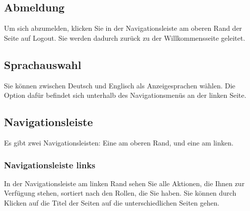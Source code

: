 \documentclass[enabledeprecatedfontcommands,fontsize=12pt,paper=a4,twoside]{scrartcl}
\begin{document}
\subsection{Abmeldung}
Um sich abzumelden, klicken Sie in der Navigationsleiste am oberen Rand der Seite auf Logout. Sie werden dadurch zurück zu der Willkommensseite geleitet. \\


\subsection{Sprachauswahl}
Sie können zwischen Deutsch und Englisch als Anzeigesprachen wählen. Die Option dafür befindet sich unterhalb des Navigationsmenüs an der linken Seite. \\


\subsection{Navigationsleiste}
Es gibt zwei Navigationsleisten: Eine am oberen Rand, und eine am linken. \\


\subsubsection{Navigationsleiste links}
In der Navigationsleiste am linken Rand sehen Sie alle Aktionen, die Ihnen zur Verfügung stehen, sortiert nach den Rollen, die Sie haben. Sie können durch Klicken auf die Titel der Seiten auf die unterschiedlichen Seiten gehen. \\
\end{document}
